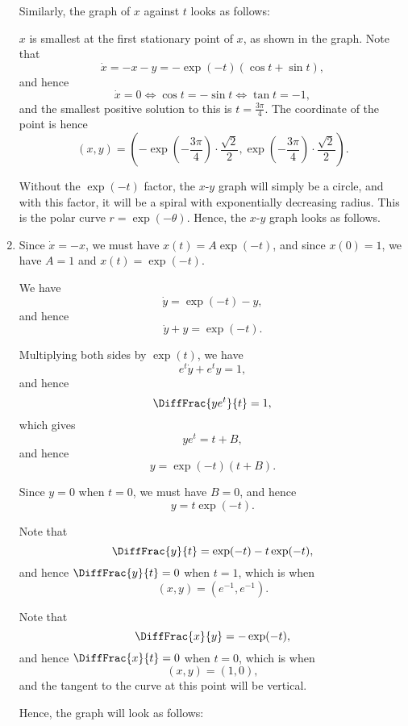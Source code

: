 \begin{enumerate}
          Similarly, the graph of \(x\) against \(t\) looks as follows:
          \begin{center}
              
          \end{center}

          \(x\) is smallest at the first stationary point of \(x\), as shown in the graph. Note that
          \[
              \dot{x} = -x - y = -\exp(-t) \left(\cos t + \sin t\right),
          \]
          and hence
          \[
              \dot{x} = 0 \iff \cos t = - \sin t \iff \tan t = -1,
          \]
          and the smallest positive solution to this is \(t = \frac{3\pi}{4}\). The coordinate of the point is hence
          \[
              (x, y) = \left(- \exp\left(-\frac{3\pi}{4}\right) \cdot \frac{\sqrt{2}}{2}, \exp\left(-\frac{3\pi}{4}\right) \cdot \frac{\sqrt{2}}{2}\right).
          \]

          Without the \(\exp(-t)\) factor, the \(x\)-\(y\) graph will simply be a circle, and with this factor, it will be a spiral with exponentially decreasing radius. This is the polar curve \(r = \exp(-\theta)\). Hence, the \(x\)-\(y\) graph looks as follows.

          \begin{center}
              
          \end{center}

    \item Since \(\dot{x} = -x\), we must have \(x(t) = A \exp(-t)\), and since \(x(0) = 1\), we have \(A = 1\) and \(x(t) = \exp(-t)\).

          We have
          \[
              \dot{y} = \exp(-t) - y,
          \]
          and hence
          \[
              \dot{y} + y = \exp(-t).
          \]

          Multiplying both sides by \(\exp(t)\), we have
          \[
              e^t \dot{y} + e^t y = 1,
          \]
          and hence
          \[
              \DiffFrac{ye^t}{t} = 1,
          \]
          which gives
          \[
              ye^t = t + B,
          \]
          and hence
          \[
              y = \exp(-t) (t + B).
          \]

          Since \(y = 0\) when \(t = 0\), we must have \(B = 0\), and hence
          \[
              y = t \exp(-t).
          \]

          Note that
          \[
            \DiffFrac{y}{t} = \exp(-t) - t \exp(-t),
          \]
          and hence \(\DiffFrac{y}{t} = 0\) when \(t = 1\), which is when
          \[
            (x, y) = \left(e^{-1}, e^{-1}\right).
          \]

          Note that
          \[
            \DiffFrac{x}{y} = - \exp(-t),
          \]
          and hence \(\DiffFrac{x}{t} = 0\) when \(t = 0\), which is when
          \[
            (x, y) = (1, 0),
          \]
          and the tangent to the curve at this point will be vertical.

          Hence, the graph will look as follows:
          \begin{center}
            
          \end{center}
\end{enumerate}